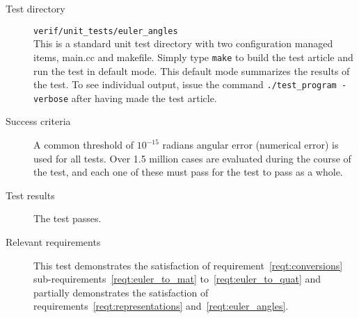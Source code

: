 \begin{description}
\item[Test directory] {\tt verif/unit\_tests/euler\_angles} \\
This is a standard unit test directory with two configuration managed items,
main.cc and makefile. Simply type {\tt make} to build the test article and run
the test in default mode. This default mode summarizes the results of the test.
To see individual output, issue the command {\tt ./test\_program -verbose} after
having made the test article.

\item[Success criteria]
A common threshold of $10^{-15}$ radians angular error (numerical error) is
used for all tests. Over 1.5 million cases are evaluated during the course of
the test, and each one of these must pass for the test to pass as a whole.

\item[Test results]
The test passes.

\item[Relevant requirements]
This test demonstrates the satisfaction of requirement~\ref{reqt:conversions}
sub-requirements~\ref{reqt:euler_to_mat} to~\ref{reqt:euler_to_quat}
and partially demonstrates the satisfaction of
requirements~\ref{reqt:representations} and~\ref{reqt:euler_angles}.

\end{description}
